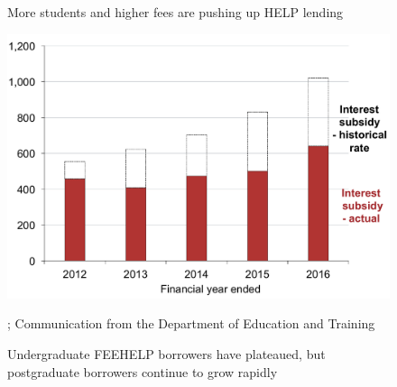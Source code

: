 \documentclass[embargoed]{grattan}
\begin{document}
\begin{figure}
\begin{minipage}[t][\textheight]{\columnwidth}
\vspace{\grattanfptop}
\caption[More students and higher fees are pushing up {HELP} lending]{More students and higher fees are pushing up \gls{HELP} lending}\label{fig:fig4-more-students-higher-fees-are-pushing-up-HELP-lending}
\includegraphics[page=4]{atlas/Chartpack.pdf}

%
{\textcites{EducationvariousyearsHighereducationreport}{Government2016Budget201617}{ABS2016ConsumerPriceIndex}{Birmingham2016MediareleaseNew}; Communication from the Department of Education and Training}
\end{minipage}
\hfill 
\begin{minipage}[t][\textheight]{\columnwidth}
\vspace{\grattanfptop}
\caption{Undergraduate \gls{FEEHELP} borrowers have plateaued, but postgraduate borrowers continue to grow rapidly}\label{fig:fig5-undergrad-HELP-borrowers-have-plateaued-but-postgrad-borrowers-continued-to-grow-rapidly}


\end{minipage}
\end{figure}
\end{document}
